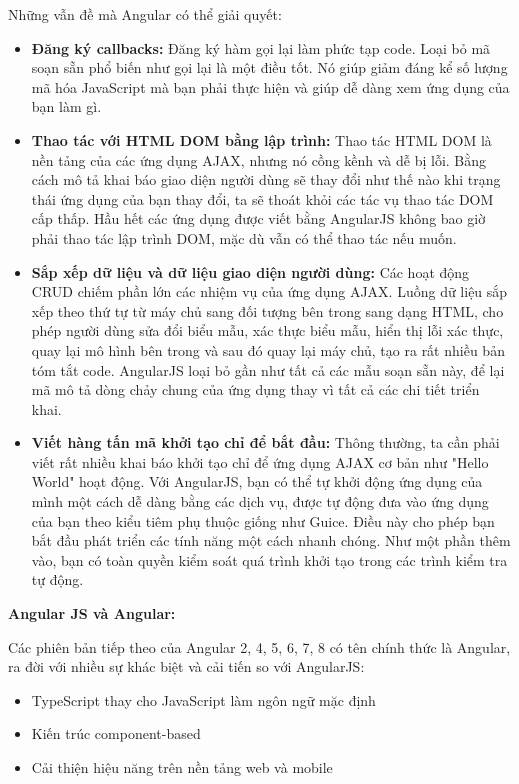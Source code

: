 Những vẫn đề mà Angular có thể giải quyết:
\begin{itemize}
    \item \textbf{Đăng ký callbacks:} Đăng ký hàm gọi lại làm phức tạp code. Loại bỏ mã soạn sẵn phổ biến như gọi lại là một điều tốt. Nó giúp giảm đáng kể số lượng mã hóa JavaScript mà bạn phải thực hiện và giúp dễ dàng xem ứng dụng của bạn làm gì.
    \item \textbf{Thao tác với HTML DOM bằng lập trình:} Thao tác HTML DOM là nền tảng của các ứng dụng AJAX, nhưng nó cồng kềnh và dễ bị lỗi. Bằng cách mô tả khai báo giao diện người dùng sẽ thay đổi như thế nào khi trạng thái ứng dụng của bạn thay đổi, ta sẽ thoát khỏi các tác vụ thao tác DOM cấp thấp. Hầu hết các ứng dụng được viết bằng AngularJS không bao giờ phải thao tác lập trình DOM, mặc dù vẫn có thể thao tác nếu muốn.
    \item \textbf{Sắp xếp dữ liệu và dữ liệu giao diện người dùng:} Các hoạt động CRUD chiếm phần lớn các nhiệm vụ của ứng dụng AJAX. Luồng dữ liệu sắp xếp theo thứ tự từ máy chủ sang đối tượng bên trong sang dạng HTML, cho phép người dùng sửa đổi biểu mẫu, xác thực biểu mẫu, hiển thị lỗi xác thực, quay lại mô hình bên trong và sau đó quay lại máy chủ, tạo ra rất nhiều bản tóm tắt code. AngularJS loại bỏ gần như tất cả các mẫu soạn sẵn này, để lại mã mô tả dòng chảy chung của ứng dụng thay vì tất cả các chi tiết triển khai.
    \item \textbf{Viết hàng tấn mã khởi tạo chỉ để bắt đầu:} Thông thường, ta cần phải viết rất nhiều khai báo khởi tạo chỉ để ứng dụng AJAX cơ bản như "Hello World" hoạt động. Với AngularJS, bạn có thể tự khởi động ứng dụng của mình một cách dễ dàng bằng các dịch vụ, được tự động đưa vào ứng dụng của bạn theo kiểu tiêm phụ thuộc giống như Guice. Điều này cho phép bạn bắt đầu phát triển các tính năng một cách nhanh chóng. Như một phần thêm vào, bạn có toàn quyền kiểm soát quá trình khởi tạo trong các trình kiểm tra tự động.
\end{itemize}

\textbf{Angular JS và Angular:}

Các phiên bản tiếp theo của Angular 2, 4, 5, 6, 7, 8 có tên chính thức là Angular, ra đời với nhiều sự khác biệt và cải tiến so với AngularJS:
\begin {itemize}
\item TypeScript thay cho JavaScript làm ngôn ngữ mặc định
\item Kiến trúc component-based
\item Cải thiện hiệu năng trên nền tảng web và mobile
\end {itemize}

